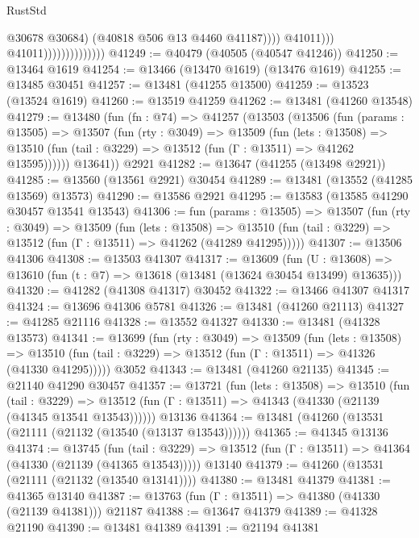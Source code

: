 \begin{lexlean}{RustStd}
\begin{coremodule}
                                              @30678
                                              @30684)
                                            (@40818 @506 @13 @4460 @41187))))
                                      @41011)))
                                @41011))))))))))))))
@41249 := @40479 (@40505 (@40547 @41246))
@41250 := @13464 @1619
@41254 := @13466 (@13470 @1619) (@13476 @1619)
@41255 := @13485 @30451
@41257 := @13481 (@41255 @13500)
@41259 := @13523 (@13524 @1619)
@41260 := @13519 @41259
@41262 := @13481 (@41260 @13548)
@41279 := @13480
    (fun (fn : @74) =>
    @41257
      (@13503
        (@13506
          (fun (params : @13505) =>
          @13507
            (fun (rty : @3049) =>
            @13509
              (fun (lets : @13508) =>
              @13510 (fun (tail : @3229) => @13512 (fun (Γ : @13511) => @41262 @13595))))))
        @13641))
    @2921
@41282 := @13647 (@41255 (@13498 @2921))
@41285 := @13560 (@13561 @2921) @30454
@41289 := @13481 (@13552 (@41285 @13569) @13573)
@41290 := @13586 @2921
@41295 := @13583 (@13585 @41290 @30457 @13541 @13543)
@41306 := fun (params : @13505) =>
  @13507
    (fun (rty : @3049) =>
    @13509
      (fun (lets : @13508) =>
      @13510 (fun (tail : @3229) => @13512 (fun (Γ : @13511) => @41262 (@41289 @41295)))))
@41307 := @13506 @41306
@41308 := @13503 @41307
@41317 := @13609
    (fun (U : @13608) => @13610 (fun (t : @7) => @13618 (@13481 (@13624 @30454 @13499) @13635)))
@41320 := @41282 (@41308 @41317) @30452
@41322 := @13466 @41307 @41317
@41324 := @13696 @41306 @5781
@41326 := @13481 (@41260 @21113)
@41327 := @41285 @21116
@41328 := @13552 @41327
@41330 := @13481 (@41328 @13573)
@41341 := @13699
    (fun (rty : @3049) =>
    @13509
      (fun (lets : @13508) =>
      @13510 (fun (tail : @3229) => @13512 (fun (Γ : @13511) => @41326 (@41330 @41295)))))
    @3052
@41343 := @13481 (@41260 @21135)
@41345 := @21140 @41290 @30457
@41357 := @13721
    (fun (lets : @13508) =>
    @13510
      (fun (tail : @3229) =>
      @13512 (fun (Γ : @13511) => @41343 (@41330 (@21139 (@41345 @13541 @13543))))))
    @13136
@41364 := @13481 (@41260 (@13531 (@21111 (@21132 (@13540 (@13137 @13543))))))
@41365 := @41345 @13136
@41374 := @13745
    (fun (tail : @3229) => @13512 (fun (Γ : @13511) => @41364 (@41330 (@21139 (@41365 @13543)))))
    @13140
@41379 := @41260 (@13531 (@21111 (@21132 (@13540 @13141))))
@41380 := @13481 @41379
@41381 := @41365 @13140
@41387 := @13763 (fun (Γ : @13511) => @41380 (@41330 (@21139 @41381))) @21187
@41388 := @13647 @41379
@41389 := @41328 @21190
@41390 := @13481 @41389
@41391 := @21194 @41381

\end{coremodule}
\end{lexlean}
